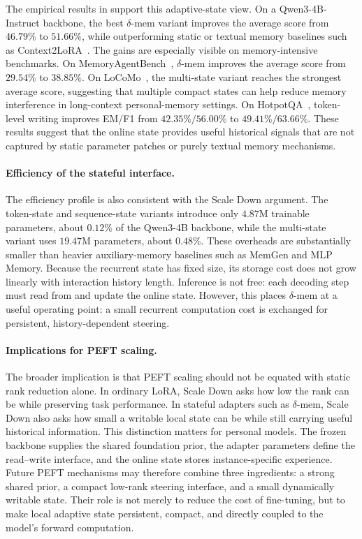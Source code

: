 The empirical results in  support this adaptive-state view. On a Qwen3-4B-Instruct backbone, the best $\delta$-mem variant improves the average score from $46.79\%$ to $51.66\%$, while outperforming static or textual memory baselines such as Context2LoRA~\citep{back2026understanding,hu2021lora}. The gains are especially visible on memory-intensive benchmarks. On MemoryAgentBench~\citep{hu2025evaluating}, $\delta$-mem improves the average score from $29.54\%$ to $38.85\%$. On LoCoMo~\citep{maharana2024longmemory}, the multi-state variant reaches the strongest average score, suggesting that multiple compact states can help reduce memory interference in long-context personal-memory settings. On HotpotQA~\citep{yang2018hotpotqa}, token-level writing improves EM/F1 from $42.35\%/56.00\%$ to $49.41\%/63.66\%$. These results suggest that the online state provides useful historical signals that are not captured by static parameter patches or purely textual memory mechanisms.

\paragraph{Efficiency of the stateful interface.}
The efficiency profile is also consistent with the Scale Down argument. The token-state and sequence-state variants introduce only $4.87$M trainable parameters, about $0.12\%$ of the Qwen3-4B backbone, while the multi-state variant uses $19.47$M parameters, about $0.48\%$. These overheads are substantially smaller than heavier auxiliary-memory baselines such as MemGen and MLP Memory. Because the recurrent state has fixed size, its storage cost does not grow linearly with interaction history length. Inference is not free: each decoding step must read from and update the online state. However, this places $\delta$-mem at a useful operating point: a small recurrent computation cost is exchanged for persistent, history-dependent steering.

\paragraph{Implications for PEFT scaling.}
The broader implication is that PEFT scaling should not be equated with static rank reduction alone. In ordinary LoRA, Scale Down asks how low the rank can be while preserving task performance. In stateful adapters such as $\delta$-mem, Scale Down also asks how small a writable local state can be while still carrying useful historical information. This distinction matters for personal models. The frozen backbone supplies the shared foundation prior, the adapter parameters define the read--write interface, and the online state stores instance-specific experience. Future PEFT mechanisms may therefore combine three ingredients: a strong shared prior, a compact low-rank steering interface, and a small dynamically writable state. Their role is not merely to reduce the cost of fine-tuning, but to make local adaptive state persistent, compact, and directly coupled to the model's forward computation.


